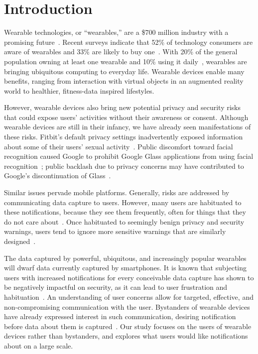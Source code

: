 
\section{Introduction}

Wearable technologies, or ``wearables,'' are a \$700 million industry with a promising future~\cite{cmo}. Recent surveys indicate that 52\% of technology consumers are aware of wearables and 33\% are likely to buy one~\cite{NPD}. With 20\% of the general population owning at least one wearable and 10\% using it daily~\cite{WearableStatNews}, wearables are bringing ubiquitous computing to everyday life. Wearable devices enable many benefits, ranging from interaction with virtual objects in an augmented reality world to healthier, fitness-data inspired lifestyles. 

However, wearable devices also bring new potential privacy and security risks that could expose users' activities without their awareness or consent. Although wearable devices are still in their infancy, we have already seen manifestations of these risks. Fitbit's default privacy settings inadvertently exposed information about some of their users' sexual activity~\cite{Fitbit}. Public discomfort toward facial recognition caused Google to prohibit Google Glass applications from using facial recognition~\cite{GlassDetection}; public backlash due to privacy concerns may have contributed to Google's discontinuation of Glass~\cite{1_russell_2014, 16_gross_2014}.

Similar issues pervade mobile platforms.  Generally, risks are addressed by communicating data capture to users. However, many users are habituated to these notifications, because they see them frequently, often for things that they do not care about~\cite{felt2012android}. Once habituated to seemingly benign privacy and security warnings, users tend to ignore more sensitive warnings that are similarly designed~\cite{Egelman08}.

The data captured by powerful, ubiquitous, and increasingly popular wearables will dwarf data currently captured by smartphones. It is known that subjecting users with increased notifications for every conceivable data capture has shown to be negatively impactful on security, as it can lead to user frustration and habituation~\cite{bohme2011security}. An understanding of user concerns allow for targeted, effective, and non-compromising communication with the user. Bystanders of wearable devices have already expressed interest in such communication, desiring notification before data about them is captured~\cite{denning2014situ}. Our study focuses on the users of wearable devices rather than bystanders, and explores what users would like notifications about on a large scale. 

